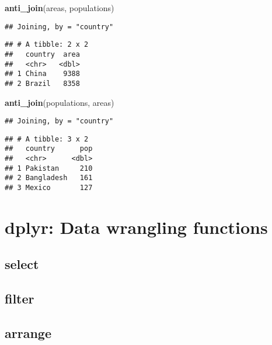 \documentclass[]{book}
\newenvironment{Shaded}{\begin{snugshade}}{\end{snugshade}}
\newcommand{\KeywordTok}[1]{\textcolor[rgb]{0.13,0.29,0.53}{\textbf{#1}}}
\newcommand{\NormalTok}[1]{#1}
\begin{document}
\begin{Shaded}
\begin{Highlighting}[]
\KeywordTok{anti_join}\NormalTok{(areas, populations)}
\end{Highlighting}
\end{Shaded}

\begin{verbatim}
## Joining, by = "country"
\end{verbatim}

\begin{verbatim}
## # A tibble: 2 x 2
##   country  area
##   <chr>   <dbl>
## 1 China    9388
## 2 Brazil   8358
\end{verbatim}

\begin{Shaded}
\begin{Highlighting}[]
\KeywordTok{anti_join}\NormalTok{(populations, areas)}
\end{Highlighting}
\end{Shaded}

\begin{verbatim}
## Joining, by = "country"
\end{verbatim}

\begin{verbatim}
## # A tibble: 3 x 2
##   country      pop
##   <chr>      <dbl>
## 1 Pakistan     210
## 2 Bangladesh   161
## 3 Mexico       127
\end{verbatim}

\hypertarget{dplyr-data-wrangling-functions}{%
\chapter{dplyr: Data wrangling functions}\label{dplyr-data-wrangling-functions}}

\hypertarget{select}{%
\section*{\texorpdfstring{\textbf{select}}{select}}\label{select}}

\hypertarget{filter}{%
\section*{\texorpdfstring{\textbf{filter}}{filter}}\label{filter}}

\hypertarget{arrange}{%
\section*{\texorpdfstring{\textbf{arrange}}{arrange}}\label{arrange}}
\end{document}
